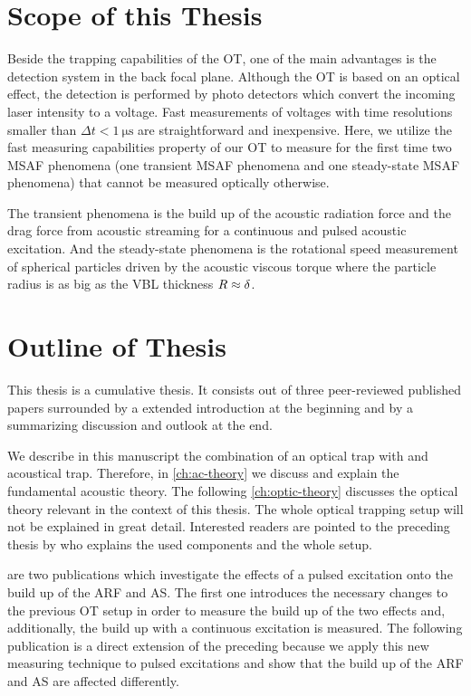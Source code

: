 \section{Scope of this Thesis}

Beside the trapping capabilities of the OT, one of the main advantages is the 
detection system in the back focal plane. Although the OT is based on an 
optical effect, the detection is performed by photo detectors which convert the 
incoming laser intensity to a voltage. Fast measurements of voltages with time 
resolutions smaller than $\Delta t < \SI{1}{\us}$ are straightforward and 
inexpensive. Here, we utilize the fast measuring capabilities property of our 
OT to measure for the first time two MSAF phenomena (one transient MSAF 
phenomena and one steady-state MSAF phenomena) that cannot be measured 
optically otherwise.

The transient phenomena is the build up of the acoustic radiation force and the 
drag force from acoustic streaming for a continuous and pulsed acoustic 
excitation. And the steady-state phenomena is the rotational speed measurement 
of spherical particles driven by the acoustic viscous torque where the particle 
radius is as big as the VBL thickness $R\approx\delta$.

\section{Outline of Thesis\label{sec:I-outline}}

This thesis is a cumulative thesis. It consists out of three peer-reviewed 
published papers surrounded by a extended introduction at the beginning and by 
a summarizing discussion and outlook at the end.

We describe in this manuscript the combination of an optical trap with and 
acoustical trap. Therefore, in \cref{ch:ac-theory} we discuss and explain the 
fundamental acoustic theory. The following \cref{ch:optic-theory} discusses the 
optical theory relevant in the context of this thesis. The whole optical 
trapping setup will not be explained in great detail. Interested readers are 
pointed to the preceding thesis by  who explains the used 
components and the whole setup.

 are two publications which investigate the 
effects of a pulsed excitation onto the build up of the ARF and AS. The first 
one introduces the necessary changes to the previous OT setup in order to 
measure the build up of the two effects and, additionally, the build up with a 
continuous excitation is measured. The following publication is a direct 
extension of the preceding because we apply this new measuring technique to 
pulsed excitations and show that the build up of the ARF and AS are affected 
differently.

